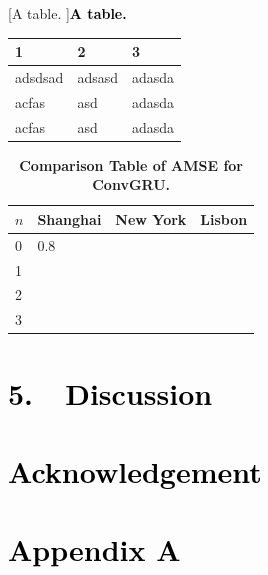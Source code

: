 \documentclass[a4paper,12pt]{article}
\begin{document}
[A table. ]{\textbf{\textcolor{black}{A table.}}\textbf{\textcolor{black}{ }}}
\begin{flushleft}
\tablefirsthead{}
\tablehead{}
\tabletail{}
\tablelasttail{}
\begin{supertabular}{m{1.8413599in}m{1.8413599in}m{1.8420599in}}
 & 2 & 3\\\hline
adsdsad & adsasd & adasda
\\
acfas & asd & adasda
\\
acfas & asd & adasda
\\\hline
\end{supertabular}
\end{flushleft}




\begin{table}[!htbp]
\centering
\caption{\textbf{Comparison Table of AMSE for ConvGRU.}}
\label{tab:conv_gru}
\begin{tabular}{p{1cm} p{2cm} p{2cm} p{2cm}}
\toprule
$n$  & Shanghai & New York & Lisbon \\
\midrule
0  & 0.8 &  &  \\
1  &  &  &  \\
2  &  &  &  \\
3  &  & &  \\

\bottomrule
\end{tabular}
\end{table}



\clearpage\section[5.\ \ Discussion]{\textbf{\textcolor{black}{5.\ \ Discussion}}}


\clearpage\section[Acknowledgement]{\textbf{\textcolor{black}{Acknowledgement}}}




\clearpage\section[References]{\textbf{\textcolor{black}{}}}




\clearpage\section[Appendix A]{\textcolor{black}{Appendix A}}

\bigskip
\end{document}
